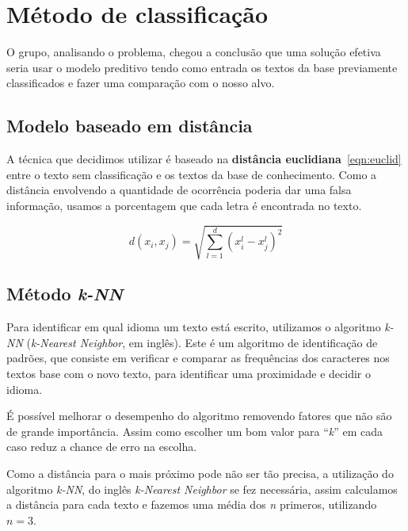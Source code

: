 \section{Método de classificação}
O grupo, analisando o problema, chegou a conclusão que uma solução efetiva seria usar o modelo preditivo tendo como entrada os textos da base previamente classificados e fazer uma comparação com o nosso alvo.

\subsection{Modelo baseado em distância}
A técnica que decidimos utilizar é baseado na \textbf{distância euclidiana}~\ref{eqn:euclid} entre o texto sem classificação e os textos da base de conhecimento. Como a distância envolvendo a quantidade de ocorrência poderia dar uma falsa informação, usamos a porcentagem que cada letra é encontrada no texto.

\[
d(x_i, x_j) = \sqrt{\sum_{l=1}^{d} (x^l_i - x^l_j)^2}
\label{eqn:euclid}
\]

\subsection{Método \emph{k-NN}}
Para identificar em qual idioma um texto está escrito, utilizamos o algoritmo \emph{k-NN} (\emph{k-Nearest Neighbor}, em inglês). Este é um algoritmo de identificação de padrões, que consiste em verificar e comparar as frequências dos caracteres nos textos base com o novo texto, para identificar uma proximidade e decidir o idioma.

É possível melhorar o desempenho do algoritmo removendo fatores que não são de grande importância. Assim como escolher um bom valor para “\emph{k}” em cada caso reduz a chance de erro na escolha.

Como a distância para o mais próximo pode não ser tão precisa, a utilização do algoritmo \emph{k-NN}, do inglês \emph{k-Nearest Neighbor} se fez necessária, assim calculamos a distância para cada texto e fazemos uma média dos \emph{n} primeros, utilizando \(n = 3\).


